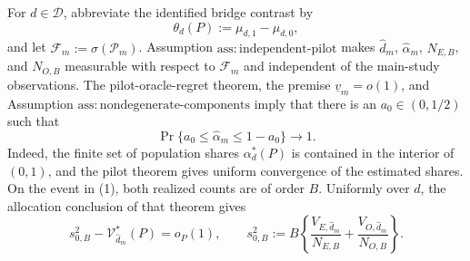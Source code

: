 For \(d\in\mathcal D\), abbreviate the identified bridge contrast by
\[
 \theta_d(P):=\mu_{d,1}-\mu_{d,0},
\]
and let \(\mathcal F_m:=\sigma(\mathcal P_m)\).  Assumption \(\mathrm{ass{:}independent\text{-}pilot}\) makes \(\widehat d_m\), \(\widehat\alpha_m\), \(N_{E,B}\), and \(N_{O,B}\) measurable with respect to \(\mathcal F_m\) and independent of the main-study observations.  The pilot-oracle-regret theorem, the premise \(\underline v_m=o(1)\), and Assumption \(\mathrm{ass{:}nondegenerate\text{-}components}\) imply that there is an \(a_0\in(0,1/2)\) such that
\[
 \Pr\{a_0\le\widehat\alpha_m\le1-a_0\}\longrightarrow1.                \tag{1}
\]
Indeed, the finite set of population shares \(\alpha_d^*(P)\) is contained in the interior of \((0,1)\), and the pilot theorem gives uniform convergence of the estimated shares.  On the event in (1), both realized counts are of order \(B\).  Uniformly over \(d\), the allocation conclusion of that theorem gives
\[
 s_{0,B}^2-\mathcal V_{\widehat d_m}^*(P)=o_P(1),
 \qquad
 s_{0,B}^2:=B\left\{
 \frac{V_{E,\widehat d_m}}{N_{E,B}}
 +\frac{V_{O,\widehat d_m}}{N_{O,B}}
 \right\}.                                                               \tag{2}
\]

